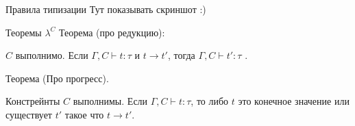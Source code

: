 \documentclass[10pt, mathserif]{beamer}
\theoremstyle{definition}
\begin{document}
\begin{frame}[fragile]{Правила типизации}
Тут показывать скриншот :)










\end{frame}


\begin{frame}[fragile]{Теоремы $\lambda^C$}
Теорема (про редукцию):

$C$ выполнимо. Если $\Gamma,C \vdash t:\tau$ и $t\to t'$, тогда
$\Gamma, C \vdash t':\tau$ .

\vspace{1cm}

Теорема (Про прогресс).

Констрейнты $C$ выполнимы. Если $\Gamma,C \vdash t:\tau$, то либо $t$ это 
конечное значение или существует $t'$ такое что $t \to t'$.
\end{frame}
\end{document}
